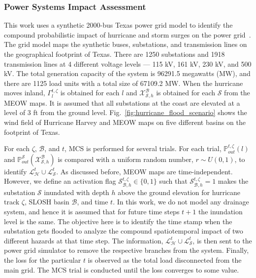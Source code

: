 \subsubsection{Power Systems Impact Assessment}
This work uses a synthetic 2000-bus Texas power grid model to identify the compound probabilistic impact of hurricane and storm surges on the power grid~\cite{7725528}. The grid model maps the synthetic buses, substations, and transmission lines on the geographical footprint of Texas. There are 1250 substations and 1918 transmission lines at 4 different voltage levels --- 115 kV, 161 kV, 230 kV, and 500 kV. The total generation capacity of the system is 96291.5 megawatts (MW), and there are 1125 load units with a total size of 67109.2 MW. When the hurricane moves inland, $\Gamma_{l}^{t,\zeta}$ is obtained for each $l$ and $\mathcal{X}^\mathcal{B}_{\mathcal{S}, h}$ is obtained for each $\mathcal{S}$ from the MEOW maps. It is assumed that all substations at the coast are elevated at a level of 3 ft from the ground level. Fig.~\ref{fig:hurricane_flood_scenario} shows the wind field of Hurricane Harvey and MEOW maps on five different basins on the footprint of Texas.     

For each $\zeta$, $\mathcal{B}$, and $t$, MCS is performed for several trials. For each trial, $\mathbb{P}_{out}^{t,\zeta}(l)$ and $\mathbb{P}^{\mathcal{S}}_{out}(\mathcal{X}^\mathcal{B}_{\mathcal{S}, h})$ is compared with a uniform random number, $r\sim U(0,1)$, to identify $\mathcal{L}^t_\mathcal{H} \cup \mathcal{L}^t_\mathcal{S}$. As discussed before, MEOW maps are time-independent. However, we define an activation flag $\mathcal{S}^{t, \zeta}_{\mathcal{B}, h} \in \{0,1\}$ such that $\mathcal{S}^{t, \zeta}_{\mathcal{B},h} = 1$ makes the substation $\mathcal{S}$ inundated with depth $h$ above the ground elevation for hurricane track $\zeta$, SLOSH basin $\mathcal{B}$, and time $t$. In this work, we do not model any drainage system, and hence it is assumed that for future time steps $t+1$ the inundation level is the same. The objective here is to identify the time stamp when the substation gets flooded to analyze the compound spatiotemporal impact of two different hazards at that time step. The information, $\mathcal{L}^t_\mathcal{H} \cup \mathcal{L}^t_\mathcal{S}$, is then sent to the power grid simulator to remove the respective branches from the system. Finally, the loss for the particular $t$ is observed as the total load disconnected from the main grid. The MCS trial is conducted until the loss converges to some value.

